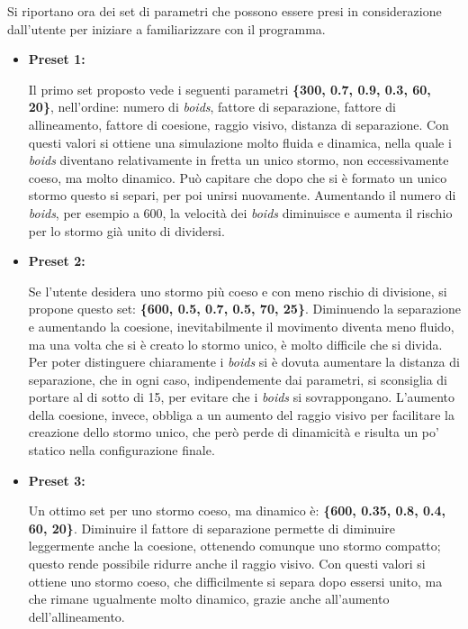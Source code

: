 \documentclass{article}
\begin{document}
Si riportano ora dei set di parametri che possono essere presi in considerazione dall'utente per iniziare a familiarizzare con il programma. 

\begin{itemize}
     

\item \large\textbf{Preset 1:} \normalsize 

 Il primo set proposto vede i seguenti parametri \textbf{\{300, 0.7, 0.9, 0.3, 60, 20\}}, nell'ordine: numero di \textit{boids}, fattore di separazione, fattore di allineamento, fattore di coesione, raggio visivo, distanza di separazione. Con questi valori si ottiene una simulazione molto fluida e dinamica, nella quale i \textit{boids} diventano relativamente in fretta un unico stormo, non eccessivamente coeso, ma molto dinamico. Può capitare che dopo che si è formato un unico stormo questo si separi, per poi unirsi nuovamente. Aumentando il numero di \textit{boids}, per esempio a 600, la velocità dei \textit{boids} diminuisce e aumenta il rischio per lo stormo già unito di dividersi.

\item \large\textbf{Preset 2:} \normalsize

Se l'utente desidera uno stormo più coeso e con meno rischio di divisione, si propone questo set: \textbf{\{600, 0.5, 0.7, 0.5, 70, 25\}}. Diminuendo la separazione e aumentando la coesione, inevitabilmente il movimento diventa meno fluido, ma una volta che si è creato lo stormo unico, è molto difficile che si divida. Per poter distinguere chiaramente i \textit{boids} si è dovuta aumentare la distanza di separazione, che in ogni caso, indipendemente dai parametri, si sconsiglia di portare al di sotto di 15, per evitare che i \textit{boids} si sovrappongano. L'aumento della coesione, invece, obbliga a un aumento del raggio visivo per facilitare la creazione dello stormo unico, che però perde di dinamicità e risulta un po' statico nella configurazione finale. 

\item \large\textbf{Preset 3:} \normalsize 

Un ottimo set per uno stormo coeso, ma dinamico è: \textbf{\{600, 0.35, 0.8, 0.4, 60, 20\}}. Diminuire il fattore di separazione permette di diminuire leggermente anche la coesione, ottenendo comunque uno stormo compatto; questo rende possibile ridurre anche il raggio visivo. Con questi valori si ottiene uno stormo coeso, che difficilmente si separa dopo essersi unito, ma che rimane ugualmente molto dinamico, grazie anche all'aumento dell'allineamento.


\end{itemize}
\end{document}
